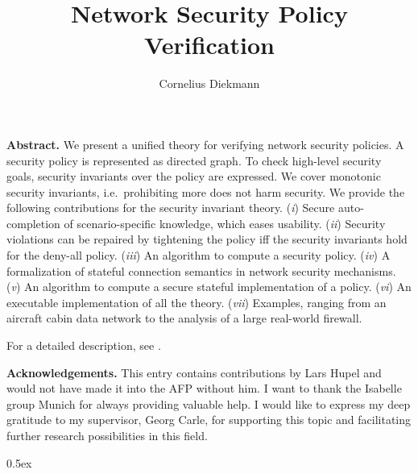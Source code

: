 \documentclass[11pt,a4paper]{article}
\begin{document}
\title{Network Security Policy Verification}
\author{Cornelius Diekmann}
\maketitle

\begin{trivlist}
\item \textbf{Abstract.}
We present a unified theory for verifying network security policies.
A security policy is represented as directed graph.
To check high-level security goals, security invariants over the policy are expressed.
We cover monotonic security invariants, i.e.\ prohibiting more does not harm security.
We provide the following contributions for the security invariant theory.
(\emph{i}) Secure auto-completion of scenario-specific knowledge, which eases usability.
(\emph{ii}) Security violations can be repaired by tightening the policy iff the security invariants hold for the deny-all policy.
(\emph{iii}) An algorithm to compute a security policy.
(\emph{iv}) A formalization of stateful connection semantics in network security mechanisms.
(\emph{v}) An algorithm to compute a secure stateful implementation of a policy.
(\emph{vi}) An executable implementation of all the theory.
(\emph{vii}) Examples, ranging from an aircraft cabin data network to the analysis of a large real-world firewall.

For a detailed description, see \cite{diekmann2015mansdnnfv,diekmann2014forte,diekmann2014esss}. 
\end{trivlist}

\medskip

\begin{trivlist}
\item \textbf{Acknowledgements.} This entry contains contributions by Lars Hupel and would not have made it into the AFP without him.
I want to thank the Isabelle group Munich for always providing valuable help.
I would like to express my deep gratitude to my supervisor, Georg Carle, for supporting this topic and facilitating further research possibilities in this field.
\end{trivlist}

\tableofcontents

\parindent 0pt\parskip 0.5ex

\newpage





\end{document}
